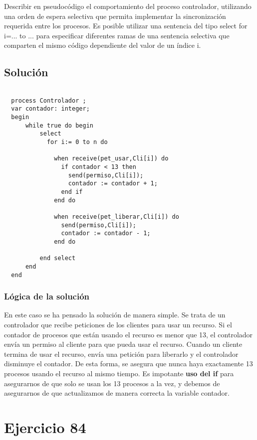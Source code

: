 \documentclass[a4paper,12pt]{article}
\begin{document}
Describir en pseudocódigo el comportamiento del proceso controlador, utilizando una orden de espera selectiva que permita implementar la sincronización requerida entre los procesos. Es posible utilizar una sentencia del tipo select for i=... to ... para especificar diferentes ramas de una sentencia selectiva que comparten el mismo código dependiente del valor de un índice i.

\subsection{Solución}

\begin{lstlisting}[style=customcpp]
  
  process Controlador ;
  var contador: integer;
  begin
      while true do begin
          select
            for i:= 0 to n do 

              when receive(pet_usar,Cli[i]) do 
                if contador < 13 then 
                  send(permiso,Cli[i]);
                  contador := contador + 1;
                end if
              end do  

              when receive(pet_liberar,Cli[i]) do 
                send(permiso,Cli[i]);
                contador := contador - 1;
              end do
          
          end select
      end 
  end

\end{lstlisting}

\subsubsection*{Lógica de la solución}

En este caso se ha pensado la solución de manera simple. Se trata de un controlador que recibe peticiones de los clientes para usar un recurso. Si el contador de procesos que están usando el recurso es menor que 13, el controlador envía un permiso al cliente para que pueda usar el recurso. Cuando un cliente termina de usar el recurso, envía una petición para liberarlo y el controlador disminuye el contador. De esta forma, se asegura que nunca haya exactamente 13 procesos usando el recurso al mismo tiempo. Es impotante \textbf{uso del if} para asegurarnos de que solo se usan los 13 procesos a la vez, y debemos de asegurarnos de que actualizamos de manera correcta la variable contador.

\section{Ejercicio 84}
\end{document}
